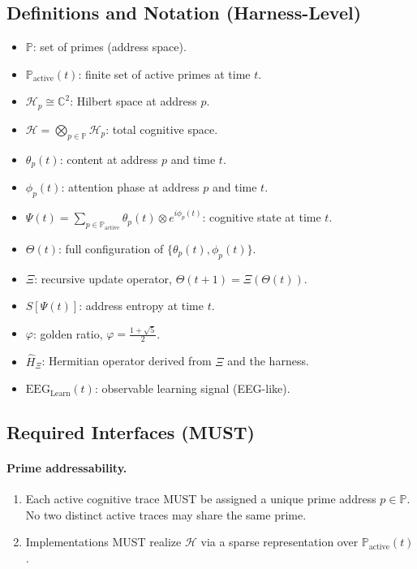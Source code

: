 \documentclass[11pt]{article}
\begin{document}
\subsection{Definitions and Notation (Harness-Level)}

\begin{itemize}[noitemsep]
  \item $\mathbb{P}$: set of primes (address space).
  \item $\mathbb{P}_{\mathrm{active}}(t)$: finite set of active primes at time $t$.
  \item $\mathcal{H}_p \cong \mathbb{C}^2$: Hilbert space at address $p$.
  \item $\mathcal{H} = \bigotimes_{p \in \mathbb{P}} \mathcal{H}_p$: total cognitive space.
  \item $\theta_p(t)$: content at address $p$ and time $t$.
  \item $\phi_p(t)$: attention phase at address $p$ and time $t$.
  \item $\Psi(t) = \sum_{p \in \mathbb{P}_{\mathrm{active}}} \theta_p(t) \otimes e^{i \phi_p(t)}$: cognitive state at time $t$.
  \item $\Theta(t)$: full configuration of $\{\theta_p(t), \phi_p(t)\}$.
  \item $\Xi$: recursive update operator, $\Theta(t+1) = \Xi(\Theta(t))$.
  \item $S[\Psi(t)]$: address entropy at time $t$.
  \item $\varphi$: golden ratio, $\varphi = \frac{1 + \sqrt{5}}{2}$.
  \item $\hat{H}_\Xi$: Hermitian operator derived from $\Xi$ and the harness.
  \item $\mathrm{EEG}_{\mathrm{Learn}}(t)$: observable learning signal (EEG-like).
\end{itemize}

\subsection{Required Interfaces (MUST)}

\paragraph{Prime addressability.}

\begin{enumerate}[label=(M\arabic*),noitemsep]
  \item Each active cognitive trace MUST be assigned a unique prime address $p \in \mathbb{P}$. No two distinct active traces may share the same prime.
  \item Implementations MUST realize $\mathcal{H}$ via a sparse representation over $\mathbb{P}_{\mathrm{active}}(t)$.
\end{enumerate}
\end{document}
